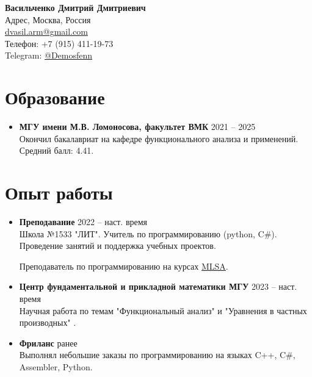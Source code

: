 \documentclass[a4paper,9pt]{article}
\begin{document}
	
	\begin{center}
		{\Huge \textbf{Васильченко Дмитрий Дмитриевич}} \\[0.5em]
		{Адрес, Москва, Россия} \\
		\href{mailto:dvasil.arm@gmail.com}{dvasil.arm@gmail.com} \\
		{Телефон: +7 (915) 411-19-73} \\
		{Telegram: \href{https://t.me/Demosfenn}{@Demosfenn}}
	\end{center}
	
	\vspace{1em}
	
	\section*{Образование}
	\begin{itemize}[left=0pt]
		\item \textbf{МГУ имени М.В. Ломоносова, факультет ВМК} \hfill 2021 -- 2025 \\
	 Окончил бакалавриат на кафедре функционального анализа и применений. Средний балл: 4.41.
	\end{itemize}
	
	\section*{Опыт работы}
	\begin{itemize}[left=0pt]
		\item \textbf{Преподавание} \hfill 2022 -- наст. время \\
		Школа №1533 "ЛИТ". Учитель по программированию (python, C$\#$). Проведение занятий и поддержка учебных проектов.
		
		Преподаватель по программированию на курсах \href{https://mvp.microsoft.com/studentambassadors}{MLSA}.
		\item \textbf{Центр фундаментальной и прикладной математики МГУ} \hfill 2023 -- наст. время \\
		Научная работа по темам "Функциональный анализ"  и "Уравнения в частных производных" .
		\item \textbf{Фриланс} \hfill ранее \\
		Выполнял небольшие заказы по программированию на языках C++, C$\#$, Assembler, Python.
	\end{itemize}
	
\end{document}
